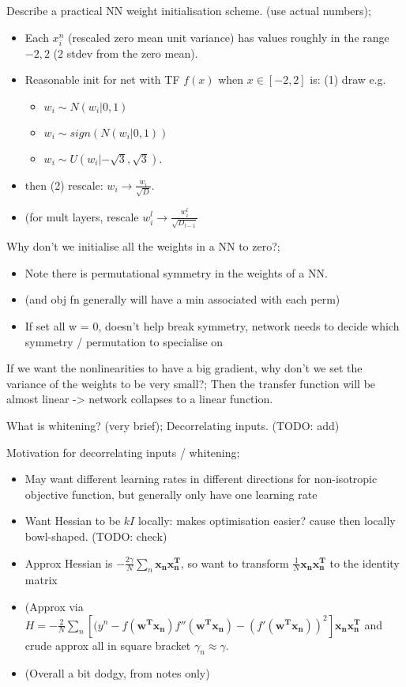 \documentclass{article}
\begin{document}
Describe a practical NN weight initialisation scheme. (use actual numbers); \begin{itemize} \item Each $x^n_i$ (rescaled zero mean unit variance) has values roughly in the range $-2, 2$ (2 stdev from the zero mean). \item Reasonable init for net with TF $f(x)$ when $x\in [-2,2]$ is: (1) draw e.g. \begin{itemize}      \item $w_i \sim N(w_i|0,1)$ \item $w_i \sim sign(N(w_i|0,1))$ \item $w_i \sim U(w_i|-\sqrt{3}, \sqrt{3})$. \end{itemize} \item then (2) rescale: $w_i \rightarrow \frac{w_i}{\sqrt{D}}$. \item (for mult layers, rescale $w^l_i \rightarrow \frac{w^l_i}{\sqrt{D_{l-1}}}$ \end{itemize}

Why don't we initialise all the weights in a NN to zero?; \begin{itemize} \item Note there is permutational symmetry in the weights of a NN. \item (and obj fn generally will have a min associated with each perm) \item If set all w = 0, doesn't help break symmetry, network needs to decide which symmetry / permutation to specialise on \end{itemize}

If we want the nonlinearities to have a big gradient, why don't we set the variance of the weights to be very small?; Then the transfer function will be almost linear -> network collapses to a linear function.

What is whitening? (very brief); Decorrelating inputs. (TODO: add)

Motivation for decorrelating inputs / whitening; \begin{itemize} \item May want different learning rates in different directions for non-isotropic objective function, but generally only have one learning rate \item Want Hessian to be $kI$ locally: makes optimisation easier? cause then locally bowl-shaped. (TODO: check) \item Approx Hessian is $-\frac{2\gamma}{N}\sum_n \mathbf{x_nx_n^T}$, so want to transform $\frac{1}{N}\mathbf{x_nx_n^T}$ to the identity matrix \item (Approx via $H=-\frac{2}{N}\sum_n[(y^n - f(\mathbf{w^Tx_n})f''(\mathbf{w^Tx_n}) - (f'(\mathbf{w^Tx_n}))^2]\mathbf{x_nx_n^T}$ and crude approx all in square bracket $\gamma_n \approx \gamma$. \item (Overall a bit dodgy, from notes only) \end{itemize}
\end{document}
